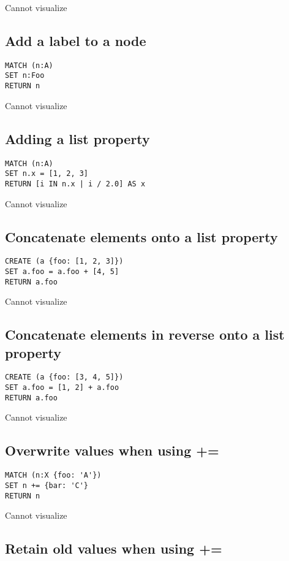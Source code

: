Cannot visualize
\subsection{Add a label to a node}

\begin{lstlisting}
MATCH (n:A)
SET n:Foo
RETURN n
\end{lstlisting}

Cannot visualize
\subsection{Adding a list property}

\begin{lstlisting}
MATCH (n:A)
SET n.x = [1, 2, 3]
RETURN [i IN n.x | i / 2.0] AS x
\end{lstlisting}

Cannot visualize
\subsection{Concatenate elements onto a list property}

\begin{lstlisting}
CREATE (a {foo: [1, 2, 3]})
SET a.foo = a.foo + [4, 5]
RETURN a.foo
\end{lstlisting}

Cannot visualize
\subsection{Concatenate elements in reverse onto a list property}

\begin{lstlisting}
CREATE (a {foo: [3, 4, 5]})
SET a.foo = [1, 2] + a.foo
RETURN a.foo
\end{lstlisting}

Cannot visualize
\subsection{Overwrite values when using +=}

\begin{lstlisting}
MATCH (n:X {foo: 'A'})
SET n += {bar: 'C'}
RETURN n
\end{lstlisting}

Cannot visualize
\subsection{Retain old values when using +=}

